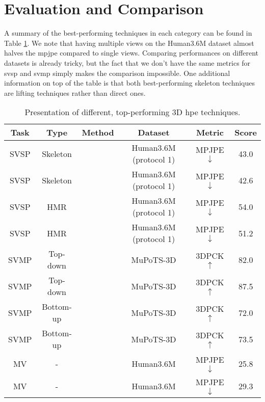 \documentclass[runningheads]{llncs}
\begin{document}
\section{Evaluation and Comparison}
A summary of the best-performing techniques in each category can be found in Table \ref{table: presentation of results}. We note that having multiple views on the Human3.6M dataset almost halves the \ac{mpjpe} compared to single views. Comparing performances on different datasets is already tricky, but the fact that we don't have the same metrics for \ac{svsp} and \ac{svmp} simply makes the comparison impossible. One additional information on top of the table is that both best-performing skeleton techniques are lifting techniques rather than direct ones.
\begin{table}
  \centering
  \caption{Presentation of different, top-performing 3D \ac{hpe} techniques.}
  \label{table: presentation of results}
  \begin{tabular}{|cccccc|}
    \hline
    Task & Type      & Method                                          & Dataset                & Metric             & Score \\ \hline
    SVSP     & Skeleton  & \cite{multi hypothesis transformer}             & Human3.6M (protocol 1) & MPJPE $\downarrow$ & 43.0  \\
    SVSP     & Skeleton  & \cite{hrnet}                                    & Human3.6M (protocol 1) & MPJPE $\downarrow$ & 42.6  \\
    SVSP     & HMR       & \cite{mesh reconstruction with transformers}    & Human3.6M (protocol 1) & MPJPE $\downarrow$ & 54.0  \\
    SVSP     & HMR       & \cite{mesh graphormer}                          & Human3.6M (protocol 1) & MPJPE $\downarrow$ & 51.2  \\ \hline
    SVMP     & Top-down  & \cite{HMOR}                                     & MuPoTS-3D              & 3DPCK $\uparrow$   & 82.0  \\
    SVMP     & Top-down  & \cite{graph and temporal convolutional network} & MuPoTS-3D              & 3DPCK $\uparrow$   & 87.5  \\
    SVMP     & Bottom-up & \cite{PandaNet}                                 & MuPoTS-3D              & 3DPCK $\uparrow$   & 72.0  \\
    SVMP     & Bottom-up & \cite{SMAP}                                     & MuPoTS-3D              & 3DPCK $\uparrow$   & 73.5  \\ \hline
    MV       & -         & \cite{Transfusion}                              & Human3.6M              & MPJPE $\downarrow$ & 25.8  \\
    MV       & -         & \cite{MetaFuse}                                 & Human3.6M              & MPJPE $\downarrow$ & 29.3  \\
    \hline
  \end{tabular}
\end{table}
\end{document}
